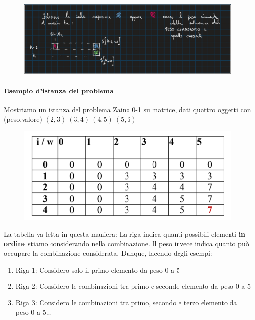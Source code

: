\documentclass{article}
\begin{document}
\begin{figure}[htbp]
        \center
        \includegraphics[scale=0.35]{img/zaino4.png}
\end{figure}

\paragraph{Esempio d'istanza del problema} Mostriamo un istanza del problema Zaino 0-1 su matrice, dati quattro oggetti con (peso,valore)
$(2,3) \: (3,4) \: (4,5) \: (5,6)$

\begin{figure}[htbp]
        \center
        \includegraphics[scale=0.5]{img/zaino5.png}
\end{figure}

La tabella va letta in questa maniera: La riga indica quanti possibili elementi \textbf{in ordine} stiamo considerando nella combinazione. Il peso invece indica quanto può occupare la combinazione considerata. Dunque, facendo degli esempi:

\begin{enumerate}
    \item Riga 1: Considero solo il primo elemento da peso 0 a 5
    \item Riga 2: Considero le combinazioni tra primo e secondo elemento da peso 0 a 5
    \item Riga 3: Considero le combinazioni tra primo, secondo e terzo elemento da peso 0 a 5...
\end{enumerate}
\end{document}
